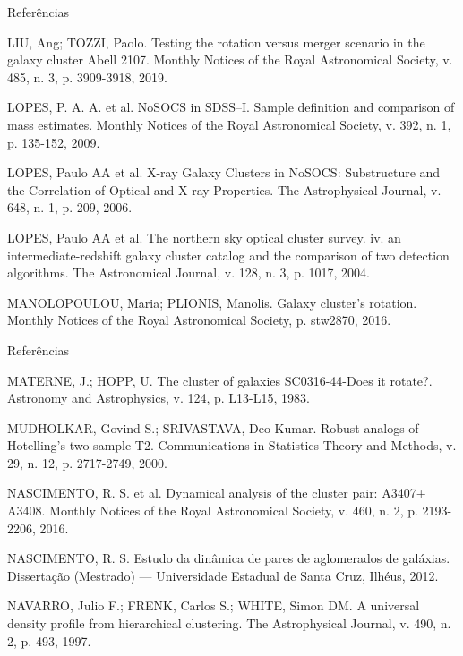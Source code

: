 \documentclass[xcolor=dvipsnames,10pt]{beamer}
\begin{document}
\begin{frame}{Referências}
  \begin{thebibliography}{9}
  \fontsize{8}{0}\selectfont
  LIU, Ang; TOZZI, Paolo. Testing the rotation versus merger scenario in the galaxy cluster Abell 2107. Monthly Notices of the Royal Astronomical Society, v. 485, n. 3, p. 3909-3918, 2019.

  LOPES, P. A. A. et al. NoSOCS in SDSS–I. Sample definition and comparison of mass estimates. Monthly Notices of the Royal Astronomical Society, v. 392, n. 1, p. 135-152, 2009.

  LOPES, Paulo AA et al. X-ray Galaxy Clusters in NoSOCS: Substructure and the Correlation of Optical and X-ray Properties. The Astrophysical Journal, v. 648, n. 1, p. 209, 2006.

  LOPES, Paulo AA et al. The northern sky optical cluster survey. iv. an intermediate-redshift galaxy cluster catalog and the comparison of two detection algorithms. The Astronomical Journal, v. 128, n. 3, p. 1017, 2004.

  MANOLOPOULOU, Maria; PLIONIS, Manolis. Galaxy cluster's rotation. Monthly Notices of the Royal Astronomical Society, p. stw2870, 2016.
  \end{thebibliography}
\end{frame}

\begin{frame}{Referências}
  \begin{thebibliography}{9}
  \fontsize{8}{0}\selectfont
  MATERNE, J.; HOPP, U. The cluster of galaxies SC0316-44-Does it rotate?. Astronomy and Astrophysics, v. 124, p. L13-L15, 1983.

  MUDHOLKAR, Govind S.; SRIVASTAVA, Deo Kumar. Robust analogs of Hotelling's two-sample T2. Communications in Statistics-Theory and Methods, v. 29, n. 12, p. 2717-2749, 2000.

  NASCIMENTO, R. S. et al. Dynamical analysis of the cluster pair: A3407+ A3408. Monthly Notices of the Royal Astronomical Society, v. 460, n. 2, p. 2193-2206, 2016.

  NASCIMENTO, R. S. Estudo da dinâmica de pares de aglomerados de galáxias. Dissertação (Mestrado) — Universidade Estadual de Santa Cruz, Ilhéus, 2012.

  NAVARRO, Julio F.; FRENK, Carlos S.; WHITE, Simon DM. A universal density profile from hierarchical clustering. The Astrophysical Journal, v. 490, n. 2, p. 493, 1997.
  \end{thebibliography}
\end{frame}
\end{document}
